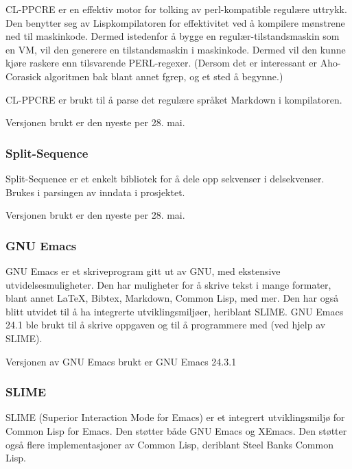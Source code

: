 \documentclass[11pt]{article}
\begin{document}
CL-PPCRE er en effektiv motor for tolking av perl-kompatible regulære uttrykk. Den benytter seg av Lispkompilatoren for effektivitet ved å kompilere mønstrene ned til maskinkode. Dermed istedenfor å bygge en regulær-tilstandsmaskin som en VM, vil den generere en tilstandsmaskin i maskinkode. Dermed vil den kunne kjøre raskere enn tilsvarende PERL-regexer. (Dersom det er interessant er Aho-Corasick algoritmen bak blant annet fgrep, og et sted å begynne.)



CL-PPCRE er brukt til å parse det regulære språket Markdown i kompilatoren.



Versjonen brukt er den nyeste per 28. mai.



\subsubsection{Split-Sequence}
Split-Sequence er et enkelt bibliotek for å dele opp sekvenser i delsekvenser.
Brukes i parsingen av inndata i prosjektet.



Versjonen brukt er den nyeste per 28. mai.



\subsubsection{GNU Emacs}



GNU Emacs er et skriveprogram gitt ut av GNU, med ekstensive utvidelsesmuligheter. Den har muligheter for å skrive tekst i mange formater, blant annet LaTeX, Bibtex, Markdown, Common Lisp, med mer. Den har også blitt utvidet til å ha integrerte utviklingsmiljøer, heriblant SLIME. GNU Emacs 24.1 ble brukt til å skrive oppgaven og til å programmere med (ved hjelp av SLIME).



Versjonen av GNU Emacs brukt er GNU Emacs 24.3.1



\subsubsection{SLIME}



SLIME (Superior Interaction Mode for Emacs) er et integrert utviklingsmiljø for Common Lisp for Emacs. Den støtter både GNU Emacs og XEmacs. Den støtter også flere implementasjoner av Common Lisp, deriblant Steel Banks Common Lisp.
\end{document}
